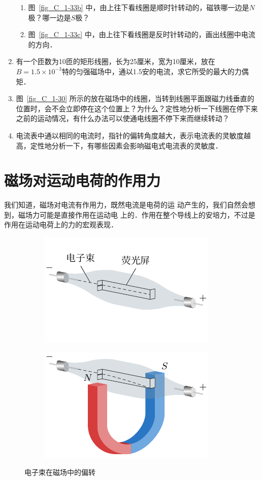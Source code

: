 \begin{enumerate}
\begin{enumerate}
        \item 图~\ref{fig_C_1-33b} 中，由上往下看线圈是顺时针转动的，磁铁哪一边是$N$极？哪一边是$S$极？
        \item 图~\ref{fig_C_1-33c} 中，由上往下看线圈是反时针转动的，画出线圈中电流的方向．
    \end{enumerate}
    \item 有一个匝数为10匝的矩形线圈，长为25厘米，宽为10厘米，放在$B=1.5\times10^{-3}$特的匀强磁场中，通以1.5安的电流，求它所受的最大的力偶矩．
    \item 图~\ref{fig_C_1-30} 所示的放在磁场中的线圈，当转到线圈平面跟磁力线垂直的位置时，会不会立即停在这个位置上？为什么？定性地分析一下线圈在停下来之前的运动情况，有什么办法可以使通电线圈不停下来而继续转动？
    \item 电流表中通以相同的电流时，指针的偏转角度越大，表示电流表的灵敏度越高，定性地分析一下，有哪些因素会影响磁电式电流表的灵敏度．
\end{enumerate}


\section{磁场对运动电荷的作用力}
我们知道，磁场对电流有作用力，既然电流是电荷的运
动产生的，我们自然会想到，磁场力可能是直接作用在运动电
上的．作用在整个导线上的安培力，不过是作用在运动电荷上的力的宏观表现．
\begin{figure}[htbp]
    \centering
    \begin{subfigure}{0.4\linewidth}
        \centering
        \includegraphics{fig/C/1-34a.pdf}
        \caption{}\label{fig_C_1-34a}
    \end{subfigure}
    \hfil
    \begin{subfigure}{0.4\linewidth}
        \centering
        \includegraphics{fig/C/1-34b.pdf}
        \caption{}\label{fig_C_1-34b}
    \end{subfigure}
    \caption{电子束在磁场中的偏转}\label{fig_C_1-34}
\end{figure}


